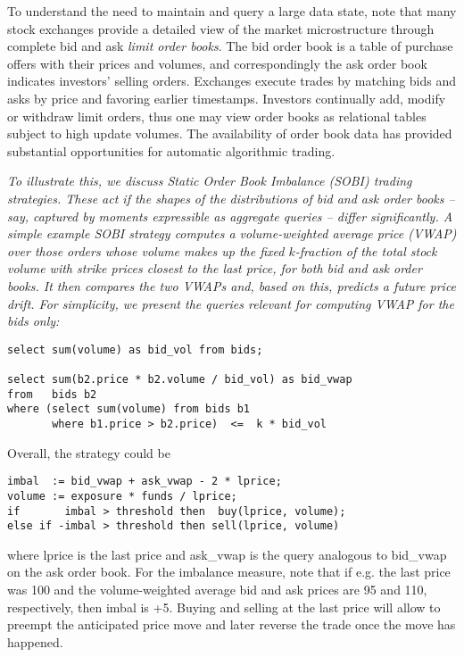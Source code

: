To understand the need to maintain and query a large data state, note that
many stock exchanges provide a detailed view of the market microstructure
through complete bid and ask {\em limit order books}. The bid order book is a
table of purchase offers with their prices and volumes, and correspondingly the
ask order book indicates investors' selling orders. Exchanges execute trades by
matching bids and asks by price and favoring earlier timestamps. Investors
continually add, modify or withdraw limit orders, thus one may view order books
as relational tables subject to high update volumes. The availability of order
book data has provided substantial opportunities for automatic algorithmic
trading.



\begin{example}\em
To illustrate this, we discuss Static Order Book Imbalance (SOBI) trading
strategies. These act if the shapes of the distributions of bid and ask
order books -- say, captured by moments expressible as aggregate queries --
differ significantly. A simple example SOBI strategy
computes a volume-weighted average price (VWAP) over those
orders whose volume makes up the fixed $k$-fraction of the total stock volume
with strike prices closest to the last price, for both
bid and ask order books. It then compares the two VWAPs and, based on
this, predicts a future price drift.
For simplicity, we present the queries relevant for computing
VWAP for the bids only:
\begin{verbatim}
select sum(volume) as bid_vol from bids;

select sum(b2.price * b2.volume / bid_vol) as bid_vwap
from   bids b2
where (select sum(volume) from bids b1
       where b1.price > b2.price)  <=  k * bid_vol
\end{verbatim}
Overall, the strategy could be
\begin{verbatim}
imbal  := bid_vwap + ask_vwap - 2 * lprice;
volume := exposure * funds / lprice;
if       imbal > threshold then  buy(lprice, volume);
else if -imbal > threshold then sell(lprice, volume)
\end{verbatim}
where lprice is the last price and
ask\_vwap is the query analogous to bid\_vwap
on the ask order book.
For the imbalance measure, note that if e.g. the last price was 100 and
the volume-weighted average bid and ask prices are 95 and 110, respectively,
then imbal is +5.
Buying and selling at the last price will allow to preempt the
anticipated price move and later reverse the trade once the
move has happened.


\end{example}
